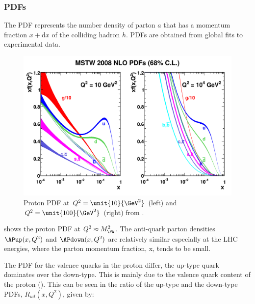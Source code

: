 

\subsubsection*{\acp{PDF}} 
The \ac{PDF} represents the number density of parton $a$ that has a momentum
fraction $x+\mathrm{d}x$ of the colliding hadron $h$.  \acp{PDF} are obtained
from global fits to experimental data.\cite{Martin:2009iq} %

\begin{figure}[htb]
  \centering
  \includegraphics[width=\textwidth]{mstw2008nlo68cl_allpdfs}
  \caption{Proton PDF at  $ Q^2 = \unit{ 10  }{\GeV^2} $ (left) 
                      and $ Q^2 = \unit{ 100  }{\GeV^2} $ (right) 
                     from \cite{Martin:2009iq}. }
  \label{wbos:pdf}
\end{figure}

 shows the proton PDF at $Q^2\approx M_{\PW}^2$.  The
anti-quark parton densities $\APup(x,Q^2)$ and $\APdown(x,Q^2)$ are relatively
similar especially at the LHC energies, where the parton momentum fraction, x,
tends to be small.

The \ac{PDF} for the valence quarks in the proton differ, the up-type quark
dominates over the down-type. This is mainly due to the valence quark content
of the proton (\HepProcess{\Pup\Pup\Pdown}).  This can be seen in the
ratio of the up-type and the down-type \acp{PDF}, $R_{ud}(x,Q^2)$, given by:

